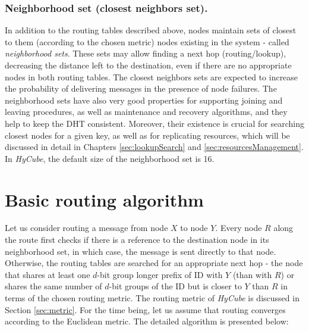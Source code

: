 \subsubsection{Neighborhood set (closest neighbors set).}


In addition to the routing tables described above, nodes maintain sets of closest to them (according to the chosen metric) nodes existing in the system - called \emph{neighborhood sets}. These sets may allow finding a next hop (routing/lookup), decreasing the distance left to the destination, even if there are no appropriate nodes in both routing tables. The closest neighbors sets are expected to increase the probability of delivering messages in the presence of node failures. The neighborhood sets have also very good properties for supporting joining and leaving procedures, as well as maintenance and recovery algorithms, and they help to keep the DHT consistent. Moreover, their existence is crucial for searching closest nodes for a given key, as well as for replicating resources, which will be discussed in detail in Chapters \ref{sec:lookupSearch} and \ref{sec:resourcesManagement}. In \emph{HyCube}, the default size of the neighborhood set is 16.








\section{Basic routing algorithm}
\label{sec:routing}

Let us consider routing a message from node $X$ to node $Y$. Every node $R$ along the route first checks if there is a reference to the destination node in its neighborhood set, in which case, the message is sent directly to that node. Otherwise, the routing tables are searched for an appropriate next hop - the node that shares at least one $d$-bit group longer prefix of ID with $Y$ (than with $R$) or shares the same number of $d$-bit groups of the ID but is closer to $Y$ than $R$ in terms of the chosen routing metric. The routing metric of \emph{HyCube} is discussed in Section \ref{sec:metric}. For the time being, let us assume that routing converges according to the Euclidean metric. The detailed algorithm is presented below:

